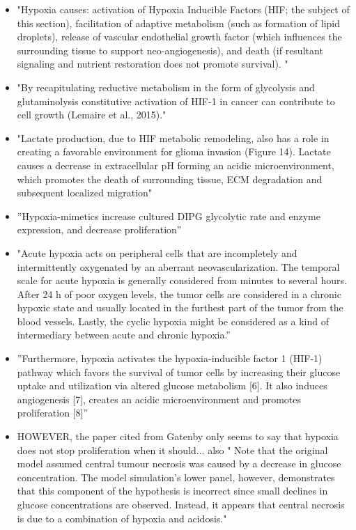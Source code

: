 \documentclass[11pt,a4paper]{article}
\begin{document}
\begin{itemize}
\item "Hypoxia causes: activation of Hypoxia Inducible Factors (HIF; the subject of this section), facilitation of adaptive metabolism (such as formation of lipid droplets), release of vascular endothelial growth factor (which influences the surrounding tissue to support neo-angiogenesis), and death (if resultant signaling and nutrient restoration does not promote survival). " \cite{Strickland2017}

\item "By recapitulating reductive metabolism in the form of glycolysis and glutaminolysis constitutive activation of HIF-1 in cancer can contribute to cell growth (Lemaire et al., 2015)." \cite{Strickland2017}

\item "Lactate production, due to HIF metabolic remodeling, also has a role in creating a favorable environment for glioma invasion (Figure 14). Lactate causes a decrease in extracellular pH forming an acidic microenvironment, which promotes the death of surrounding tissue, ECM degradation and subsequent localized migration" \cite{Strickland2017}

\item ”Hypoxia-mimetics increase cultured DIPG glycolytic rate and enzyme expression, and decrease proliferation” \cite{Waker2018}

\item "Acute hypoxia acts on peripheral cells that are incompletely and intermittently oxygenated by an aberrant neovascularization. The temporal scale for acute hypoxia is generally considered from minutes to several hours. After 24 h of poor oxygen levels, the tumor cells are considered in a chronic hypoxic state and usually located in the furthest part of the tumor from the blood vessels. Lastly, the cyclic hypoxia might be considered as a kind of intermediary between acute and chronic hypoxia.”\cite{Fuchs2020}

\item ”Furthermore, hypoxia activates the hypoxia-inducible factor 1 (HIF-1) pathway which favors the survival of tumor cells by increasing their glucose uptake and utilization via altered glucose metabolism [6]. It also induces angiogenesis [7], creates an acidic microenvironment and promotes proliferation [8]”\cite{Shen2020}

\item HOWEVER, the paper cited from Gatenby only seems to say that hypoxia does not stop proliferation when it should... also 
" Note that the original model assumed central tumour necrosis was caused by a decrease in glucose concentration. The model simulation's lower panel, however, demonstrates that this component of the hypothesis is incorrect since small declines in glucose concentrations are observed. Instead, it appears that central necrosis is due to a combination of hypoxia and acidosis."\cite{Gatenby2007}


\end{itemize}
\end{document}
